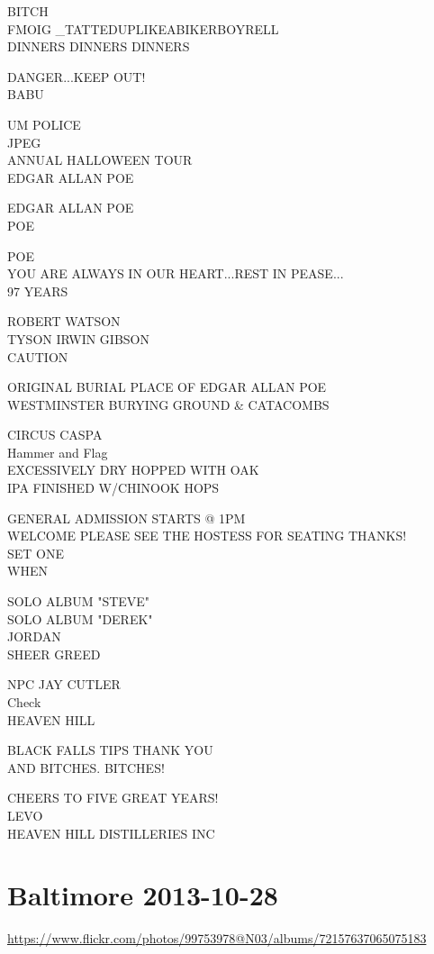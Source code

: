 \documentclass[10pt,letterpaper]{article}
\begin{document}
BITCH\\
FMOIG \_TATTEDUPLIKEABIKERBOYRELL\\
DINNERS DINNERS DINNERS

DANGER...KEEP OUT!\\
BABU

UM POLICE\\
JPEG\\
ANNUAL HALLOWEEN TOUR\\
EDGAR ALLAN POE

EDGAR ALLAN POE\\
POE

POE\\
YOU ARE ALWAYS IN OUR HEART...REST IN PEASE...\\
97 YEARS

ROBERT WATSON\\
TYSON IRWIN GIBSON\\
CAUTION

ORIGINAL BURIAL PLACE OF EDGAR ALLAN POE\\
WESTMINSTER BURYING GROUND \& CATACOMBS

CIRCUS CASPA\\
Hammer and Flag\\
EXCESSIVELY DRY HOPPED WITH OAK\\
IPA FINISHED W/CHINOOK HOPS

GENERAL ADMISSION STARTS @ 1PM\\
WELCOME PLEASE SEE THE HOSTESS FOR SEATING THANKS!\\
SET ONE\\
WHEN

SOLO ALBUM "STEVE"\\
SOLO ALBUM "DEREK"\\
JORDAN\\
SHEER GREED

NPC JAY CUTLER\\
Check\\
HEAVEN HILL

BLACK FALLS TIPS THANK YOU\\
AND BITCHES.  BITCHES!

CHEERS TO FIVE GREAT YEARS!\\
LEVO\\
HEAVEN HILL DISTILLERIES INC


\section*{Baltimore 2013-10-28}

\url{https://www.flickr.com/photos/99753978@N03/albums/72157637065075183}
\end{document}

